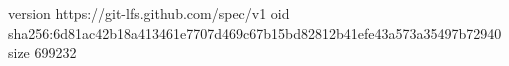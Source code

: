 version https://git-lfs.github.com/spec/v1
oid sha256:6d81ac42b18a413461e7707d469c67b15bd82812b41efe43a573a35497b72940
size 699232

